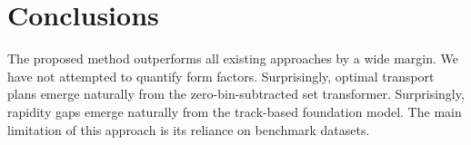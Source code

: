 \section{Conclusions}\label{sec:conclusions}

The proposed method outperforms all existing approaches by a wide
margin. We have not attempted to quantify form factors. Surprisingly,
optimal transport plans emerge naturally from the zero-bin-subtracted
set transformer. Surprisingly, rapidity gaps emerge naturally from the
track-based foundation model. The main limitation of this approach is
its reliance on benchmark datasets.

